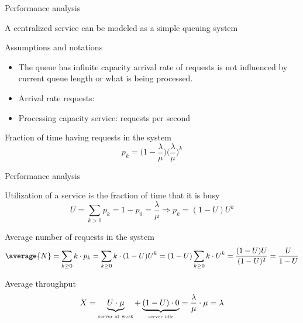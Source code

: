   \begin{slide}{Performance analysis}
    \begin{block}{A centralized service can be modeled as a simple queuing system}
      \centering{}
    \end{block}
    \begin{block}{Assumptions and notations}
      \begin{itemize}\tightlist
      \item The queue has infinite capacity \mathexpr{\Rightarrow} arrival rate of requests is not influenced
        by current queue length or what is being processed.
      \item Arrival rate requests: \mathexpr{\lambda}
      \item Processing capacity service: \mathexpr{\mu} requests per second
      \end{itemize}
    \end{block}
    \begin{alertblock}{Fraction of time having  requests in the system}
      \[ p_k = \bigl(1 - \frac{\lambda}{\mu}\bigr)\bigl(\frac{\lambda}{\mu}\bigr)^k \]
    \end{alertblock}
  \end{slide}
  \begin{slide}{Performance analysis}
    \begin{block}{Utilization  of a service is the fraction of time that it is busy}
      \[ U = \sum_{k > 0} p_k = 1 - p_0 = \frac{\lambda}{\mu} \Rightarrow p_k = (1-U) U^k \]
    \end{block}
    \begin{block}{Average number of requests in the system}
      \[ \average{N} = \sum_{k\geq 0} k \cdot p_k = \sum_{k \geq 0} k \cdot (1-U)U^k = (1-U)\sum_{k\geq 0} k\cdot U^k
      = \frac{(1-U)U}{(1-U)^2} = \frac{U}{1-U} \]
    \end{block}
    \begin{block}{Average throughput}
      \[ X = \underbrace{U \cdot \mu}_{\mbox{\tiny server at work}} + \underbrace{(1-U) \cdot 0}_{\mbox{\tiny
        server idle}} = \frac{\lambda}{\mu} \cdot \mu = \lambda \]
    \end{block}
  \end{slide}
